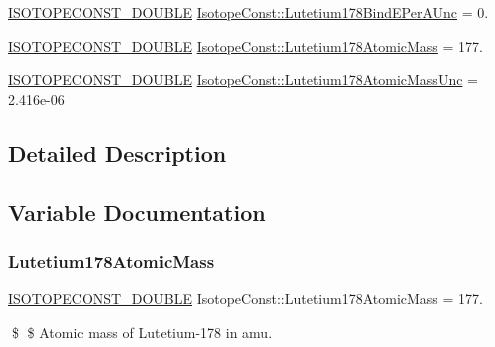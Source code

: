 \begin{DoxyCompactItemize}
\mbox{\hyperlink{group___isotope_const-_macros_ga8f45a7272ce02c0b4c65c44636ed719a}{I\+S\+O\+T\+O\+P\+E\+C\+O\+N\+S\+T\+\_\+\+D\+O\+U\+B\+LE}} \mbox{\hyperlink{group___isotope_const-_lutetium-_lu178_ga9d18ff1aee3ec11135a192b8f1ec53c0}{Isotope\+Const\+::\+Lutetium178\+Bind\+E\+Per\+A\+Unc}} = 0.
\item 
\mbox{\hyperlink{group___isotope_const-_macros_ga8f45a7272ce02c0b4c65c44636ed719a}{I\+S\+O\+T\+O\+P\+E\+C\+O\+N\+S\+T\+\_\+\+D\+O\+U\+B\+LE}} \mbox{\hyperlink{group___isotope_const-_lutetium-_lu178_gaea354e1ea0b8a2b1971c65cc1e4d5d32}{Isotope\+Const\+::\+Lutetium178\+Atomic\+Mass}} = 177.
\item 
\mbox{\hyperlink{group___isotope_const-_macros_ga8f45a7272ce02c0b4c65c44636ed719a}{I\+S\+O\+T\+O\+P\+E\+C\+O\+N\+S\+T\+\_\+\+D\+O\+U\+B\+LE}} \mbox{\hyperlink{group___isotope_const-_lutetium-_lu178_ga4914b5321ede1582cd164c3490b88623}{Isotope\+Const\+::\+Lutetium178\+Atomic\+Mass\+Unc}} = 2.\+416e-\/06
\end{DoxyCompactItemize}


\subsection{Detailed Description}


\subsection{Variable Documentation}
\mbox{\label{group___isotope_const-_lutetium-_lu178_gaea354e1ea0b8a2b1971c65cc1e4d5d32}} 
\subsubsection{\texorpdfstring{Lutetium178\+Atomic\+Mass}{Lutetium178AtomicMass}}
{\footnotesize\ttfamily \mbox{\hyperlink{group___isotope_const-_macros_ga8f45a7272ce02c0b4c65c44636ed719a}{I\+S\+O\+T\+O\+P\+E\+C\+O\+N\+S\+T\+\_\+\+D\+O\+U\+B\+LE}} Isotope\+Const\+::\+Lutetium178\+Atomic\+Mass = 177.}

\$ \$ Atomic mass of Lutetium-\/178 in amu. \mbox{\label{group___isotope_const-_lutetium-_lu178_ga4914b5321ede1582cd164c3490b88623}} 
